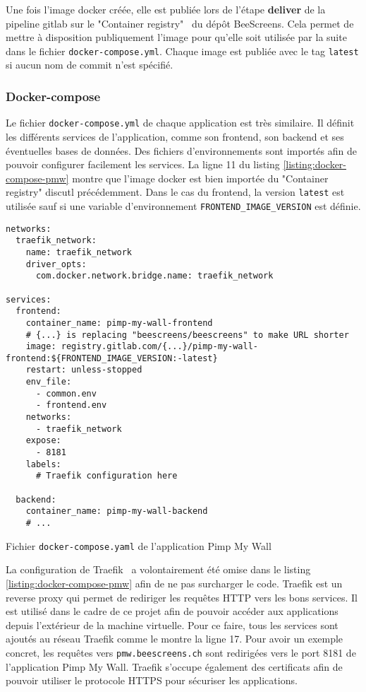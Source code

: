 Une fois l'image \gls{docker} créée, elle est publiée lors de l'étape \textbf{deliver} de la pipeline \gls{gitlab} sur le "Container registry"~\cite{beescreens-container-registry} du dépôt BeeScreens. Cela permet de mettre à disposition publiquement l'image pour qu'elle soit utilisée par la suite dans le fichier \texttt{docker-compose.yml}. Chaque image est publiée avec le tag \texttt{latest} si aucun nom de commit n'est spécifié.

\subsubsection{Docker-compose}

Le fichier \texttt{docker-compose.yml} de chaque application est très similaire. Il définit les différents services de l'application, comme son frontend, son backend et ses éventuelles bases de données. Des fichiers d'environnements sont importés afin de pouvoir configurer facilement les services. La ligne 11 du listing \ref{listing:docker-compose-pmw} montre que l'image \gls{docker} est bien importée du "Container registry" discutl précédemment. Dans le cas du frontend, la version \texttt{latest} est utilisée sauf si une variable d'environnement \texttt{FRONTEND\_IMAGE\_VERSION} est définie.

\begin{listing}[H]
  \begin{verbatim}
networks:
  traefik_network:
    name: traefik_network
    driver_opts:
      com.docker.network.bridge.name: traefik_network

services:
  frontend:
    container_name: pimp-my-wall-frontend
    # {...} is replacing "beescreens/beescreens" to make URL shorter
    image: registry.gitlab.com/{...}/pimp-my-wall-frontend:${FRONTEND_IMAGE_VERSION:-latest}
    restart: unless-stopped
    env_file:
      - common.env
      - frontend.env
    networks:
      - traefik_network
    expose:
      - 8181
    labels:
      # Traefik configuration here

  backend:
    container_name: pimp-my-wall-backend
    # ...
\end{verbatim}
  \caption{Fichier \texttt{docker-compose.yaml} de l'application Pimp My Wall}
  \label{listing:docker-compose-pmw}
\end{listing}

La configuration de Traefik~\cite{traefik} a volontairement été omise dans le listing \ref{listing:docker-compose-pmw} afin de ne pas surcharger le code. Traefik est un reverse proxy qui permet de rediriger les requêtes HTTP vers les bons services. Il est utilisé dans le cadre de ce projet afin de pouvoir accéder aux applications depuis l'extérieur de la machine virtuelle. Pour ce faire, tous les services sont ajoutés au réseau Traefik comme le montre la ligne 17. Pour avoir un exemple concret, les requêtes vers \texttt{pmw.beescreens.ch} sont redirigées vers le port 8181 de l'application Pimp My Wall. Traefik s'occupe également des certificats afin de pouvoir utiliser le protocole HTTPS pour sécuriser les applications.

